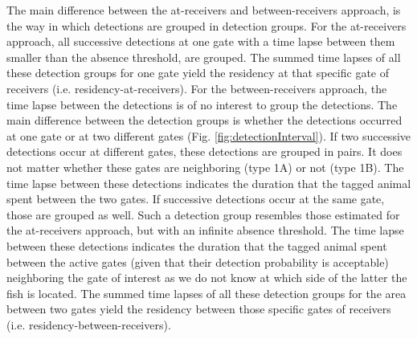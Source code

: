 \documentclass[preprint,12pt,authoryear]{elsarticle}
\begin{document}
\begin{spacing}{1.9}
The main difference between the at-receivers and between-receivers approach, is the way in which detections are grouped in detection groups. For the at-receivers approach, all successive detections at one gate with a time lapse between them smaller than the absence threshold, are grouped. The summed time lapses of all these detection groups for one gate yield the residency at that specific gate of receivers (i.e. residency-at-receivers).  
For the between-receivers approach, the time lapse between the detections is of no interest to group the detections. The main difference between the detection groups is whether the detections occurred at one gate or at two different gates (Fig. \ref{fig:detectionInterval}). 
If two successive detections occur at different gates, these detections are grouped in pairs. It does not matter whether these gates are neighboring (type 1A) or not (type 1B). The time lapse between these detections indicates the duration that the tagged animal spent between the two gates. 
If successive detections occur at the same gate, those are grouped as well. Such a detection group resembles those estimated for the at-receivers approach, but with an infinite absence threshold. The time lapse between these detections indicates the duration that the tagged animal spent between the active gates (given that their detection probability is acceptable) neighboring the gate of interest as we do not know at which side of the latter the fish is located. The summed time lapses of all these detection groups for the area between two gates yield the residency between those specific gates of receivers (i.e. residency-between-receivers). 


\end{spacing}
\end{document}
